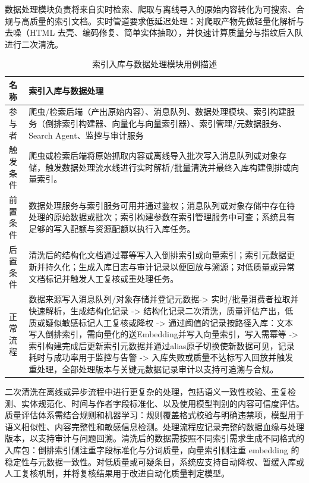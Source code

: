 数据处理模块负责将来自实时检索、爬取与离线导入的原始内容转化为可搜索、合规与高质量的索引文档。实时管道要求低延迟处理：对爬取产物先做轻量化解析与去噪（HTML 去壳、编码修复、简单实体抽取），并快速计算质量分与指纹后入队进行二次清洗。
\begin{table}[H] \centering \caption{索引入库与数据处理模块用例描述} \label{tab:nonperiodic-usecase} 
{\renewcommand{\arraystretch}{1.} 
\begin{tabular}{p{3cm} p{11cm}} \hline 
名称 & 索引入库与数据处理 \\ \hline 参与者 & 爬虫/检索后端（产出原始内容）、消息队列、数据处理模块、索引构建服务（倒排索引构建器、向量化与向量索引器）、索引管理/元数据服务、Search Agent、监控与审计服务 \\ \hline 触发条件 & 爬虫或检索后端将原始抓取内容或离线导入批次写入消息队列或对象存储，触发数据处理流水线进行实时解析/批量清洗并最终入库构建倒排或向量索引。 \\ \hline 前置条件 & 数据处理服务与索引服务可用并通过鉴权；消息队列或对象存储中存在待处理的原始数据或批次；索引构建参数在索引管理服务中可查；系统具有足够的写入配额与资源配额以执行入库任务。 \\ \hline 后置条件 & 清洗后的结构化文档通过幂等写入入倒排索引或向量索引；索引元数据更新并持久化；生成入库日志与审计记录以便回放与溯源；对低质量或异常文档标记并触发人工复核或重处理任务。 \\ \hline 正常流程 &
数据来源写入消息队列/对象存储并登记元数据-> 实时/批量消费者拉取并快速解析，生成结构化记录 -> 结构化记录二次清洗，质量评估产出，低质或疑似敏感标记人工复核或降权 -> 通过阈值的记录按路径入库：文本写入倒排索引，需向量化的送Embedding并写入向量索引，写入需幂等 -> 索引构建完成后更新索引元数据并通过alias原子切换使新数据可见，记录耗时与成功率用于监控与告警 -> 入库失败或质量不达标写入回放并触发重处理，全部处理版本与关键元数据记录审计以支持可追溯与合规。 \\ \hline \end{tabular} } \end{table}

二次清洗在离线或异步流程中进行更复杂的处理，包括语义一致性校验、重复检测、实体规范化、时间与作者字段标准化、以及使用模型判别的内容可信度评估。质量评估体系需结合规则和机器学习：规则覆盖格式校验与明确违禁项，模型用于语义相似性、内容完整性和敏感信息检测。处理流程应记录完整的数据血缘与处理版本，以支持审计与问题回溯。清洗后的数据需按照不同索引需求生成不同格式的入库包：倒排索引侧注重字段标准化与分词质量，向量索引侧注重 embedding 的稳定性与元数据一致性。对低质量或可疑条目，系统应支持自动降权、暂缓入库或人工复核机制，并将复核结果用于改进自动化质量判定模型。

